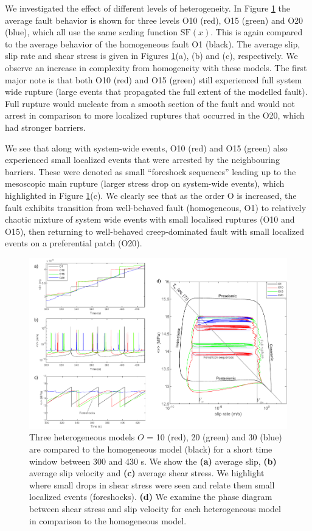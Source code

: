 \documentclass[preprint,1p, 10pt,authoryear]{elsarticle}
\begin{document}
We investigated the effect of different levels of heterogeneity. In Figure \ref{fig7} the average fault behavior is shown for three levels O10 (red), O15 (green) and O20 (blue), which all use the same scaling function $\mathrm{SF}(x)$.  This is again compared to the average behavior of the homogeneous fault O1 (black).  The average slip, slip rate and shear stress is given in Figures \ref{fig7}(a), (b) and (c), respectively.  We observe an increase in complexity from homogeneity with these models. The first major note is that both O10 (red) and O15 (green) still experienced full system wide rupture (large events that propagated the full extent of the modelled fault).  Full rupture would nucleate from a smooth section of the fault and would not arrest in comparison to more localized ruptures that occurred in the O20, which had stronger barriers. 

We see that along with system-wide events, O10 (red) and O15 (green) also experienced small localized events that were arrested by the neighbouring barriers. These were denoted as small ``foreshock sequences'' leading up to the mesoscopic main rupture (larger stress drop on system-wide events), which highlighted in Figure \ref{fig7}(c). We clearly see that as the order O is increased, the fault exhibits transition from well-behaved fault (homogeneous, O1) to relatively chaotic mixture of system wide events with small localised ruptures (O10 and O15), then returning to well-behaved creep-dominated fault with small localized events on a preferential patch (O20).

\begin{figure}
	\centering
	\includegraphics{FIG7.pdf} 
	\caption{Three heterogeneous models $O$ =  10 (red), 20 (green) and 30 (blue) are compared to the homogeneous model (black) for a short time window between 300 and 430 s. We show the \textbf{(a)} average slip, \textbf{(b)} average slip velocity and \textbf{(c)} average shear stress.  We highlight where small drops in shear stress were seen and relate them small localized events (foreshocks). \textbf{(d)} We examine the phase diagram between shear stress and slip velocity for each heterogeneous model in comparison to the homogeneous model.}
	\label{fig7}
\end{figure} 
\end{document}

